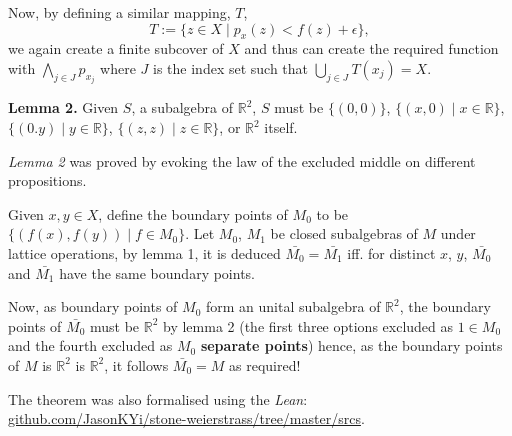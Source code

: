 \documentclass[landscape,final,a0paper]{baposter}
\begin{document}
\begin{poster}
{Now, by defining a similar mapping, $T$,  
$$T := \{z \in X \mid p_x(z) < f(z) + \epsilon \},$$
we again create a finite subcover of $X$ and thus can create the required function with $\bigwedge_{j \in J}p_{x_j}$ where $J$ 
is the index set such that $\bigcup_{j\in J} T(x_j) = X$.

\vspace{2mm}
{\bf Lemma 2.} Given $S$, a subalgebra of $\mathbb{R}^2$, $S$ must be $\{(0,0)\}$, 
$\{(x, 0) \mid x \in \mathbb{R} \}$,
$\{(0. y) \mid y \in \mathbb{R} \}$, 
$\{(z, z) \mid z \in \mathbb{R} \}$, or
$\mathbb{R}^2$ itself.

\textit{Lemma 2} was proved by evoking the law of the excluded middle on different propositions.

\vspace{2mm}
Given $x, y \in X$, define the boundary points of $M_0$ to be $\{(f(x), f(y)) \mid f \in M_0 \}$.
Let $M_0$, $M_1$ be closed subalgebras of $M$ under lattice operations,
by lemma 1, it is deduced $\bar{M_0} = \bar{M_1}$ iff. for distinct $x$, $y$, $\bar{M_0}$ and $\bar{M_1}$ have the same boundary points.

\vspace{2mm}
Now, as boundary points of $M_0$ form an unital subalgebra of $\mathbb{R}^2$, the boundary points of  $\bar{M_0}$ must be $\mathbb{R}^2$ by lemma 2 (the first three options excluded as $1 \in M_0$ and the fourth excluded as $M_0$ \textbf{separate points}) hence, as the boundary points of $M$ is $\mathbb{R}^2$ is $\mathbb{R}^2$, it follows $\bar{M_0} = M$ as required!

\vspace{2mm}
The theorem was also formalised using the \textit{Lean}:\\ \url{github.com/JasonKYi/stone-weierstrass/tree/master/srcs}. 

\vspace{0.2em}
  }
	
  
\end{poster}
\end{document}
